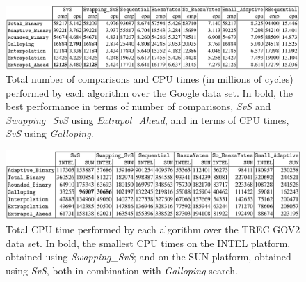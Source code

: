 \begin{figure}[h] 
    \begin{center}
        \includegraphics[width=.8\textwidth]{imgs/birbay_table5.png}
        \caption{Total number of comparisons and CPU times (in millions of cycles) performed by each algorithm over the Google data set.
        In bold, the best performance in terms of number of comparisons, \textit{SvS} and \textit{Swapping\_SvS} using \textit{Extrapol\_Ahead}, and in terms
        of CPU times, \textit{SvS} using \textit{Galloping}. \citep{birbay_ortiz} \label{fig:birbay2}}
    \end{center}
\end{figure}

\begin{figure}[h] 
    \begin{center}
        \includegraphics[width=.8\textwidth]{imgs/birbay_table7.png}
        \caption{Total CPU time performed by each algorithm over the TREC GOV2 data set. In bold, the smallest CPU times on the INTEL
        platform, obtained using \textit{Swapping\_SvS}; and on the SUN platform, obtained using \textit{SvS}, both in combination with \textit{Galloping}
        search. \citep{birbay_ortiz} \label{fig:birbay3}}
    \end{center}
\end{figure}